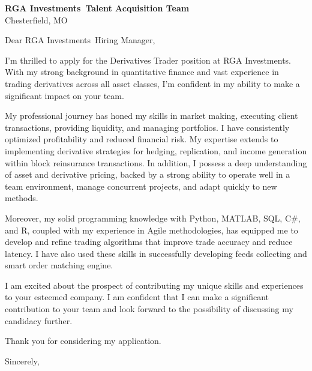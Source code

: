 \documentclass{letter}
\newcommand{\company}{RGA Investments}
\begin{document}
\begin{letter}{\textbf{\company\ Talent Acquisition Team} \\                
    Chesterfield, MO }

\opening{Dear \company\ Hiring Manager,}

I'm thrilled to apply for the Derivatives Trader position at RGA Investments. With my strong background in quantitative finance and vast experience in trading derivatives across all asset classes, I'm confident in my ability to make a significant impact on your team.

My professional journey has honed my skills in market making, executing client transactions, providing liquidity, and managing portfolios. I have consistently optimized profitability and reduced financial risk. My expertise extends to implementing derivative strategies for hedging, replication, and income generation within block reinsurance transactions. In addition, I possess a deep understanding of asset and derivative pricing, backed by a strong ability to operate well in a team environment, manage concurrent projects, and adapt quickly to new methods.

Moreover, my solid programming knowledge with Python, MATLAB, SQL, C\#, and R, coupled with my experience in Agile methodologies, has equipped me to develop and refine trading algorithms that improve trade accuracy and reduce latency. I have also used these skills in successfully developing feeds collecting and smart order matching engine.

I am excited about the prospect of contributing my unique skills and experiences to your esteemed company. I am confident that I can make a significant contribution to your team and look forward to the possibility of discussing my candidacy further. 

Thank you for considering my application.



\closing{Sincerely,}

\end{letter}
\end{document}
